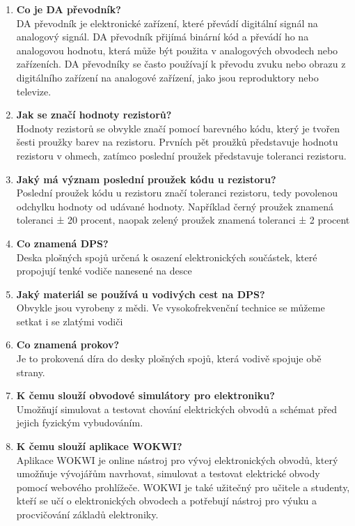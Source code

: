 \documentclass{article}
\begin{document}
\begin{enumerate}
        \item \textbf{Co je DA převodník?} \\[0.6em] { DA převodník je elektronické zařízení, které převádí digitální signál na analogový signál. DA převodník přijímá binární kód a převádí ho na analogovou hodnotu, která může být použita v analogových obvodech nebo zařízeních. DA převodníky se často používají k převodu zvuku nebo obrazu z digitálního zařízení na analogové zařízení, jako jsou reproduktory nebo televize.}
        \item \textbf{Jak se značí hodnoty rezistorů?} \\[0.6em] { Hodnoty rezistorů se obvykle značí pomocí barevného kódu, který je tvořen šesti proužky barev na rezistoru. Prvních pět proužků představuje hodnotu rezistoru v ohmech, zatímco poslední proužek představuje toleranci rezistoru.}
        \item \textbf{Jaký má význam poslední proužek kódu u rezistoru?} \\[0.6em] { Poslední proužek kódu u rezistoru značí toleranci rezistoru, tedy povolenou odchylku hodnoty od udávané hodnoty. Například černý proužek znamená toleranci ± 20 procent, naopak zelený proužek znamená toleranci ± 2 procent}
        \item \textbf{Co znamená DPS?} \\[0.6em] { Deska plošných spojů určená k osazení elektronických součástek, které propojují tenké vodiče nanesené na desce}
        \item \textbf{Jaký materiál se používá u vodivých cest na DPS?} \\[0.6em] { Obvykle jsou vyrobeny z mědi. Ve vysokofrekvenční technice se můžeme setkat i se zlatými vodiči}
        \item \textbf{Co znamená prokov?} \\[0.6em] { Je to prokovená díra do desky plošných spojů, která vodivě spojuje obě strany.}
        \item \textbf{K čemu slouží obvodové simulátory pro elektroniku?} \\[0.6em] { Umožňují simulovat a testovat chování elektrických obvodů a schémat před jejich fyzickým vybudováním.}
        \item \textbf{K čemu slouží aplikace WOKWI?} \\[0.6em] { Aplikace WOKWI je online nástroj pro vývoj elektronických obvodů, který umožňuje vývojářům navrhovat, simulovat a testovat elektrické obvody pomocí webového prohlížeče. WOKWI je také užitečný pro učitele a studenty, kteří se učí o elektronických obvodech a potřebují nástroj pro výuku a procvičování základů elektroniky.}

\end{enumerate}
\end{document}
